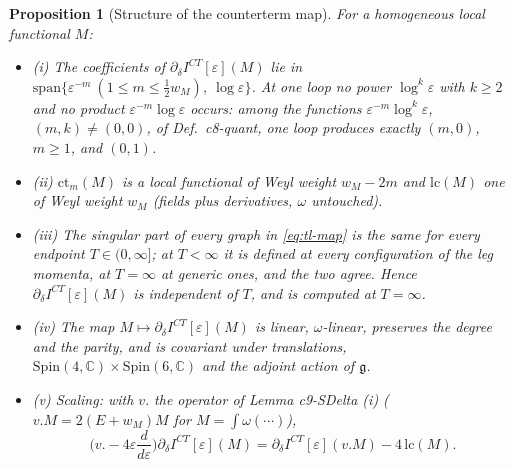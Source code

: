 \documentclass[11pt]{article}
\numberwithin{equation}{section}
\theoremstyle{plain}
\newtheorem{proposition}[theorem]{Proposition}
\theoremstyle{definition}
\begin{document}
\begin{proposition}[Structure of the counterterm map]
\label{prop:tl-map}
For a homogeneous local functional $M$:
\begin{itemize}
\item (i) The coefficients of $\partial_\delta I^{CT}[\varepsilon](M)$ lie in $\mathrm{span}\{\varepsilon^{-m}\ (1\le m\le\tfrac12w_M),\ \log\varepsilon\}$. At one loop no power $\log^k\varepsilon$ with $k\ge2$ and no product $\varepsilon^{-m}\log\varepsilon$ occurs: among the functions $\varepsilon^{-m}\log^k\varepsilon$, $(m,k)\ne(0,0)$, of Def.~c8-quant, one loop produces exactly $(m,0)$, $m\ge1$, and $(0,1)$.
\item (ii) $\mathrm{ct}_m(M)$ is a local functional of Weyl weight $w_M-2m$ and $\mathrm{lc}(M)$ one of Weyl weight $w_M$ (fields plus derivatives, $\omega$ untouched).
\item (iii) The singular part of every graph in \eqref{eq:tl-map} is the same for every endpoint $T\in(0,\infty]$; at $T<\infty$ it is defined at every configuration of the leg momenta, at $T=\infty$ at generic ones, and the two agree. Hence $\partial_\delta I^{CT}[\varepsilon](M)$ is independent of $T$, and is computed at $T=\infty$.
\item (iv) The map $M\mapsto\partial_\delta I^{CT}[\varepsilon](M)$ is linear, $\omega$-linear, preserves the degree and the parity, and is covariant under translations, $\mathrm{Spin}(4,\mathbb C)\times\mathrm{Spin}(6,\mathbb C)$ and the adjoint action of $\mathfrak g$.
\item (v) Scaling: with $v.$ the operator of Lemma c9-SDelta (i) ($v.M=2(E+w_M)M$ for $M=\int\omega(\cdots)$),
\begin{equation}
\Big(v.-4\varepsilon\frac{d}{d\varepsilon}\Big)\partial_\delta I^{CT}[\varepsilon](M)=\partial_\delta I^{CT}[\varepsilon](v.M)-4\,\mathrm{lc}(M).
\label{eq:tl-scaling}
\end{equation}
\end{itemize}
\end{proposition}
\end{document}
